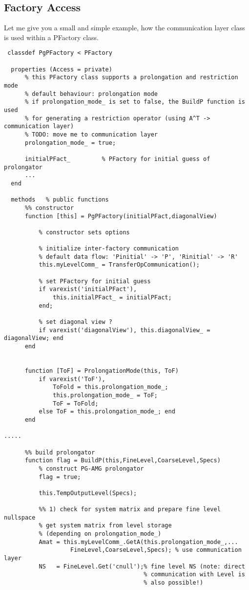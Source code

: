 \subsection{Factory Access}

Let me give you a small and simple example, how the communication layer class is used within a PFactory class.
\begin{verbatim}
 classdef PgPFactory < PFactory

  properties (Access = private)
      % this PFactory class supports a prolongation and restriction mode
      % default behaviour: prolongation mode
      % if prolongation_mode_ is set to false, the BuildP function is used
      % for generating a restriction operator (using A^T -> communication layer)
      % TODO: move me to communication layer
      prolongation_mode_ = true;

      initialPFact_         % PFactory for initial guess of prolongator
      ...
  end

  methods   % public functions
      %% constructor
      function [this] = PgPFactory(initialPFact,diagonalView) 

          % constructor sets options

          % initialize inter-factory communication
          % default data flow: 'Pinitial' -> 'P', 'Rinitial' -> 'R'
          this.myLevelComm_ = TransferOpCommunication();

          % set PFactory for initial guess
          if varexist('initialPFact'), 
              this.initialPFact_ = initialPFact; 
          end;

          % set diagonal view ?
          if varexist('diagonalView'), this.diagonalView_ = diagonalView; end
      end


      function [ToF] = ProlongationMode(this, ToF)
          if varexist('ToF'),
              ToFold = this.prolongation_mode_;
              this.prolongation_mode_ = ToF;
              ToF = ToFold;
          else ToF = this.prolongation_mode_; end
      end

.....

      %% build prolongator
      function flag = BuildP(this,FineLevel,CoarseLevel,Specs)
          % construct PG-AMG prolongator
          flag = true;

          this.TempOutputLevel(Specs);

          %% 1) check for system matrix and prepare fine level nullspace
          % get system matrix from level storage 
          % (depending on prolongation_mode_)
          Amat = this.myLevelComm_.GetA(this.prolongation_mode_,...
                   FineLevel,CoarseLevel,Specs); % use communication layer
          NS   = FineLevel.Get('cnull');% fine level NS (note: direct
                                        % communication with Level is
                                        % also possible!)


\end{verbatim}
